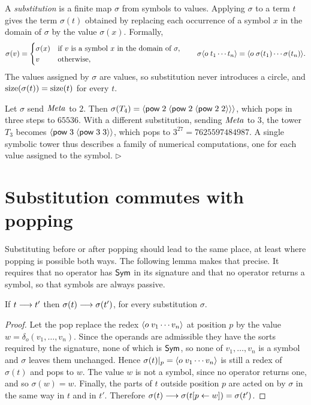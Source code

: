 A \emph{substitution} is a finite map $\sigma$ from symbols to values. Applying $\sigma$ to a term $t$ gives the term $\sigma(t)$ obtained by replacing each occurrence of a symbol $x$ in the domain of $\sigma$ by the value $\sigma(x)$. Formally,
\[
\sigma(v)=
\begin{cases}
\sigma(x) & \text{if } v \text{ is a symbol } x \text{ in the domain of } \sigma,\\
v & \text{otherwise,}
\end{cases}
\qquad
\sigma\langle o\; t_1\cdots t_n\rangle=\langle o\; \sigma(t_1)\cdots\sigma(t_n)\rangle .
\]
The values assigned by $\sigma$ are values, so substitution never introduces a circle, and $\operatorname{size}(\sigma(t))=\operatorname{size}(t)$ for every $t$.

\begin{example}
Let $\sigma$ send $\mathit{Meta}$ to $2$. Then $\sigma(T_4)=\langle \mathsf{pow}\; 2\; \langle \mathsf{pow}\; 2\; \langle \mathsf{pow}\; 2\; 2\rangle\rangle\rangle$, which pops in three steps to $65536$. With a different substitution, sending $\mathit{Meta}$ to $3$, the tower $T_3$ becomes $\langle \mathsf{pow}\; 3\; \langle \mathsf{pow}\; 3\; 3\rangle\rangle$, which pops to $3^{27}=7625597484987$. A single symbolic tower thus describes a family of numerical computations, one for each value assigned to the symbol. \hfill$\triangleright$
\end{example}

\section{Substitution commutes with popping}

Substituting before or after popping should lead to the same place, at least where popping is possible both ways. The following lemma makes that precise. It requires that no operator has $\mathsf{Sym}$ in its signature and that no operator returns a symbol, so that symbols are always passive.

\begin{lemma}\label{lem:subst}
If $t\longrightarrow t'$ then $\sigma(t)\longrightarrow\sigma(t')$, for every substitution $\sigma$.
\end{lemma}
\begin{proof}
Let the pop replace the redex $\langle o\; v_1\cdots v_n\rangle$ at position $p$ by the value $w=\delta_o(v_1,\dots,v_n)$. Since the operands are admissible they have the sorts required by the signature, none of which is $\mathsf{Sym}$, so none of $v_1,\dots,v_n$ is a symbol and $\sigma$ leaves them unchanged. Hence $\sigma(t)|_p=\langle o\; v_1\cdots v_n\rangle$ is still a redex of $\sigma(t)$ and pops to $w$. The value $w$ is not a symbol, since no operator returns one, and so $\sigma(w)=w$. Finally, the parts of $t$ outside position $p$ are acted on by $\sigma$ in the same way in $t$ and in $t'$. Therefore $\sigma(t)\longrightarrow\sigma(t[p\leftarrow w])=\sigma(t')$.
\end{proof}

